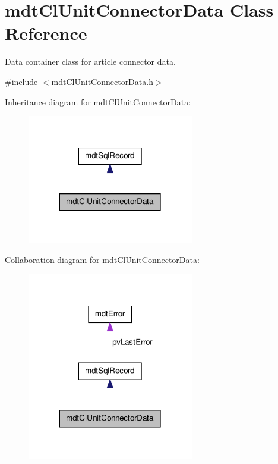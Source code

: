 \hypertarget{classmdt_cl_unit_connector_data}{\section{mdt\-Cl\-Unit\-Connector\-Data Class Reference}
\label{classmdt_cl_unit_connector_data}
}


Data container class for article connector data.  




{\ttfamily \#include $<$mdt\-Cl\-Unit\-Connector\-Data.\-h$>$}



Inheritance diagram for mdt\-Cl\-Unit\-Connector\-Data\-:
\nopagebreak
\begin{figure}[H]
\begin{center}
\leavevmode
\includegraphics[width=206pt]{classmdt_cl_unit_connector_data__inherit__graph}
\end{center}
\end{figure}


Collaboration diagram for mdt\-Cl\-Unit\-Connector\-Data\-:
\nopagebreak
\begin{figure}[H]
\begin{center}
\leavevmode
\includegraphics[width=206pt]{classmdt_cl_unit_connector_data__coll__graph}
\end{center}
\end{figure}
